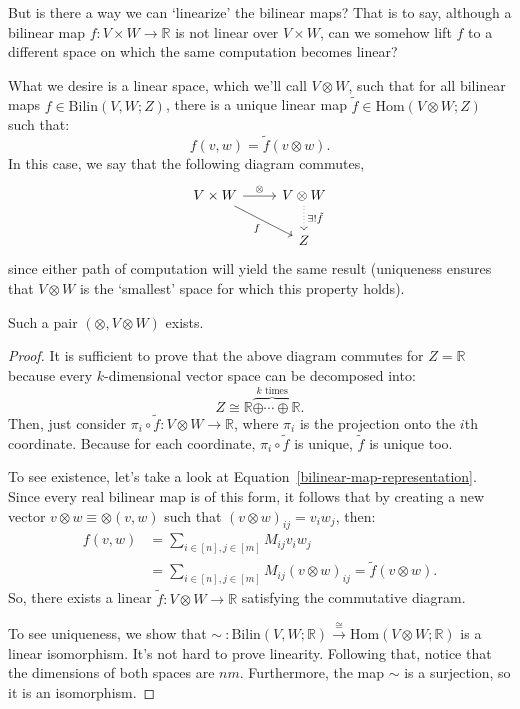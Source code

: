 But is there a way we can `linearize' the bilinear maps? That is to say, although a bilinear map $f: V \times W \to \mathbb{R}$ is not linear over $V \times W$, can we somehow lift $f$ to a different space on which the same computation becomes linear?

What we desire is a linear space, which we'll call $V \otimes W$, such that for all bilinear maps $f \in \mathrm{Bilin}(V, W; Z)$, there is a unique linear map $\tilde{f} \in \mathrm{Hom}(V\otimes W; Z)$ such that:
\begin{equation*}
  f(v,w) = \tilde{f}(v\otimes w).
\end{equation*}
In this case, we say that the following diagram commutes,
\[\begin{tikzcd}
V \times W \arrow{r}{\otimes} \arrow[swap]{dr}{f} & V \otimes W \arrow[dotted]{d}{\exists !\tilde{f}} \\
& Z
\end{tikzcd}\]
since either path of computation will yield the same result (uniqueness ensures that $V \otimes W$ is the `smallest' space for which this property holds).

\begin{proposition}
Such a pair $(\otimes, V\otimes W)$ exists. 
\end{proposition}

\begin{proof}
It is sufficient to prove that the above diagram commutes for $Z = \mathbb{R}$ because every $k$-dimensional vector space can be decomposed into:
\[Z \cong \mathbb{R} \overbrace{\oplus \dotsm \oplus}^{k \textrm{ times}} \mathbb{R}.\]
Then, just consider $\pi_i \circ \tilde{f} : V \otimes W \to \mathbb{R}$, where $\pi_i$ is the projection onto the $i$th coordinate. Because for each coordinate, $\pi_i \circ \tilde{f}$ is unique, $\tilde{f}$ is unique too.

To see existence, let's take a look at Equation~\ref{bilinear-map-representation}. Since every real bilinear map is of this form, it follows that by creating a new vector $v\otimes w \equiv \otimes (v,w) $ such that $(v \otimes w)_{ij} = v_iw_j$, then:
\begin{align*}
f(v,w) &= \sum_{i\in[n], j\in [m]} M_{ij} v_iw_j \\
&= \sum_{i\in[n], j\in [m]} M_{ij} (v \otimes w)_{ij} = \tilde{f}(v \otimes w).
\end{align*}
So, there exists a linear $\tilde{f} : V \otimes W \to \mathbb{R}$ satisfying the commutative diagram.

To see uniqueness, we show that $\sim \ : \mathrm{Bilin}(V,W; \mathbb{R}) \overset{\cong}{\longrightarrow} \mathrm{Hom}(V \otimes W; \mathbb{R})$ is a linear isomorphism. It's not hard to prove linearity. Following that, notice that the dimensions of both spaces are $n m$. Furthermore, the map $\sim$ is a surjection, so it is an isomorphism.
\end{proof}

